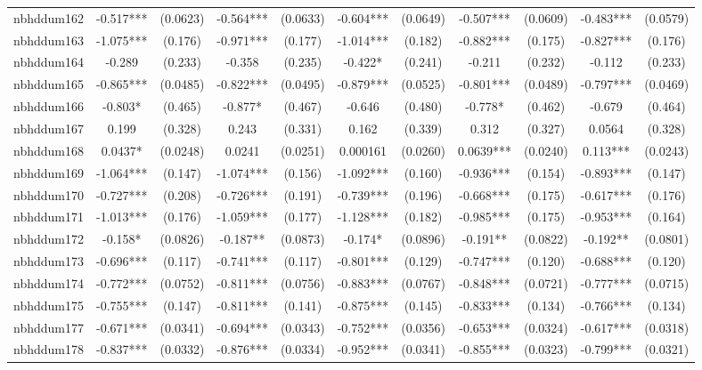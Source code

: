 \documentclass[]{article}
\begin{document}
\begin{tabular}{lcccccccccc}
nbhddum162 & -0.517*** & (0.0623) & -0.564*** & (0.0633) & -0.604*** & (0.0649) & -0.507*** & (0.0609) & -0.483*** & (0.0579) \\
nbhddum163 & -1.075*** & (0.176) & -0.971*** & (0.177) & -1.014*** & (0.182) & -0.882*** & (0.175) & -0.827*** & (0.176) \\
nbhddum164 & -0.289 & (0.233) & -0.358 & (0.235) & -0.422* & (0.241) & -0.211 & (0.232) & -0.112 & (0.233) \\
nbhddum165 & -0.865*** & (0.0485) & -0.822*** & (0.0495) & -0.879*** & (0.0525) & -0.801*** & (0.0489) & -0.797*** & (0.0469) \\
nbhddum166 & -0.803* & (0.465) & -0.877* & (0.467) & -0.646 & (0.480) & -0.778* & (0.462) & -0.679 & (0.464) \\
nbhddum167 & 0.199 & (0.328) & 0.243 & (0.331) & 0.162 & (0.339) & 0.312 & (0.327) & 0.0564 & (0.328) \\
nbhddum168 & 0.0437* & (0.0248) & 0.0241 & (0.0251) & 0.000161 & (0.0260) & 0.0639*** & (0.0240) & 0.113*** & (0.0243) \\
nbhddum169 & -1.064*** & (0.147) & -1.074*** & (0.156) & -1.092*** & (0.160) & -0.936*** & (0.154) & -0.893*** & (0.147) \\
nbhddum170 & -0.727*** & (0.208) & -0.726*** & (0.191) & -0.739*** & (0.196) & -0.668*** & (0.175) & -0.617*** & (0.176) \\
nbhddum171 & -1.013*** & (0.176) & -1.059*** & (0.177) & -1.128*** & (0.182) & -0.985*** & (0.175) & -0.953*** & (0.164) \\
nbhddum172 & -0.158* & (0.0826) & -0.187** & (0.0873) & -0.174* & (0.0896) & -0.191** & (0.0822) & -0.192** & (0.0801) \\
nbhddum173 & -0.696*** & (0.117) & -0.741*** & (0.117) & -0.801*** & (0.129) & -0.747*** & (0.120) & -0.688*** & (0.120) \\
nbhddum174 & -0.772*** & (0.0752) & -0.811*** & (0.0756) & -0.883*** & (0.0767) & -0.848*** & (0.0721) & -0.777*** & (0.0715) \\
nbhddum175 & -0.755*** & (0.147) & -0.811*** & (0.141) & -0.875*** & (0.145) & -0.833*** & (0.134) & -0.766*** & (0.134) \\
nbhddum177 & -0.671*** & (0.0341) & -0.694*** & (0.0343) & -0.752*** & (0.0356) & -0.653*** & (0.0324) & -0.617*** & (0.0318) \\
nbhddum178 & -0.837*** & (0.0332) & -0.876*** & (0.0334) & -0.952*** & (0.0341) & -0.855*** & (0.0323) & -0.799*** & (0.0321) \\

\end{tabular}
\end{document}
